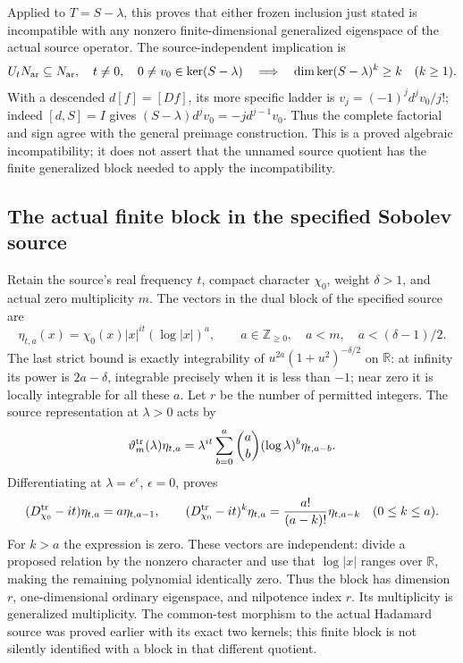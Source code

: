 Applied to $T=S-\lambda$, this proves that either frozen
inclusion just stated is incompatible with any nonzero
finite-dimensional generalized eigenspace of the actual source
operator. The source-independent implication is
\begin{equation}
\begin{gathered}
 U_tN_{\rm ar}\subseteq N_{\rm ar},\quad t\ne0,\quad
                  0\ne v_0\in\ker(S-\lambda)
 \quad\Longrightarrow\quad
 \dim\ker(S-\lambda)^k\geq k\quad(k\geq1).
\end{gathered}
\label{eq:cq-source-surjective-chain}
\end{equation}
With a descended $d[f]=[Df]$, its more specific ladder is
$v_j=(-1)^jd^jv_0/j!$; indeed
$[d,S]=I$ gives $(S-\lambda)d^jv_0=-j d^{j-1}v_0$.
Thus the complete factorial and sign agree with the general
preimage construction. This is a proved algebraic incompatibility;
it does not assert that the unnamed source quotient has the
finite generalized block needed to apply the incompatibility.

\subsection{The actual finite block in the specified Sobolev source}

Retain the source's real frequency $t$, compact character $\chi_0$,
weight $\delta>1$, and actual zero multiplicity $m$.
The vectors in the dual block of the specified source are
\[
 \eta_{t,a}(x)=\chi_0(x)|x|^{it}(\log|x|)^a,\qquad
 a\in\mathbb Z_{\geq0},\quad a<m,\quad a<(\delta-1)/2 .
\]
The last strict bound is exactly integrability of
$u^{2a}(1+u^2)^{-\delta/2}$ on $\mathbb R$: at infinity
its power is $2a-\delta$, integrable precisely when it is
less than $-1$; near zero it is locally integrable for all
these $a$. Let $r$ be the number of permitted integers.
The source representation at $\lambda>0$ acts by
\[
 \vartheta_m^{\rm tr}(\lambda)\eta_{t,a}
 =\lambda^{it}\sum_{b=0}^a\binom ab(\log\lambda)^b\eta_{t,a-b}.
\]
Differentiating at $\lambda=e^\epsilon$, $\epsilon=0$, proves
\begin{equation}
 (D_{\chi_0}^{\rm tr}-it)\eta_{t,a}=a\eta_{t,a-1},\qquad
 (D_{\chi_0}^{\rm tr}-it)^k\eta_{t,a}
 =\frac{a!}{(a-k)!}\eta_{t,a-k}\quad(0\leq k\leq a).
 \label{eq:cq-source-Sobolev-Jordan-block}
\end{equation}
For $k>a$ the expression is zero. These vectors are independent:
divide a proposed relation by the nonzero character and use
that $\log|x|$ ranges over $\mathbb R$, making the remaining
polynomial identically zero. Thus the block has dimension
$r$, one-dimensional ordinary eigenspace, and nilpotence
index $r$. Its multiplicity is generalized multiplicity.
The common-test morphism to the actual Hadamard source was
proved earlier with its exact two kernels; this finite
block is not silently identified with a block in that
different quotient.

